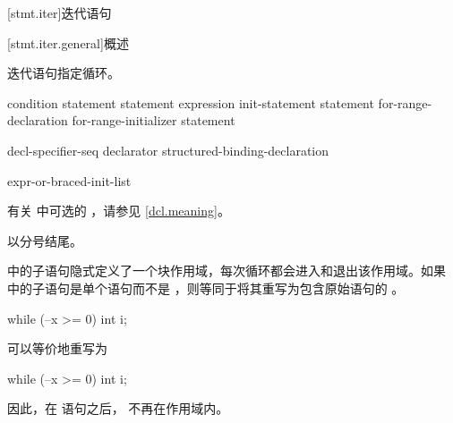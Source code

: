 
[stmt.iter]{迭代语句}%

[stmt.iter.general]{概述}%

\pnum
迭代语句指定循环。

%
%
%
%
\begin{bnf}
\br
     \terminal{(} condition \terminal{)} statement\br
     statement  \terminal{(} expression \terminal{)} \terminal{;}\br
     \terminal{(} init-statement  \terminal{;}  \terminal{)} statement\br
     \terminal{(}  for-range-declaration \terminal{:} for-range-initializer \terminal{)} statement
\end{bnf}

\begin{bnf}
\br
     decl-specifier-seq declarator\br
    structured-binding-declaration
\end{bnf}

\begin{bnf}
\br
    expr-or-braced-init-list
\end{bnf}

有关  中可选的 ，请参见 \ref{dcl.meaning}。
\begin{note}
 以分号结尾。
\end{note}

\pnum
{}%
 中的子语句隐式定义了一个块作用域，每次循环都会进入和退出该作用域。如果  中的子语句是单个语句而不是 ，则等同于将其重写为包含原始语句的 。
\begin{example}
\begin{codeblock}
while (--x >= 0)
  int i;
\end{codeblock}
可以等价地重写为
\begin{codeblock}
while (--x >= 0) {
  int i;
}
\end{codeblock}
因此，在  语句之后， 不再在作用域内。
\end{example}

